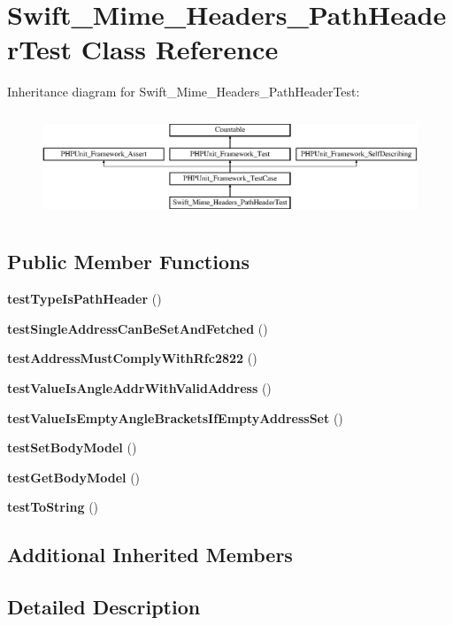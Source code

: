 \section{Swift\+\_\+\+Mime\+\_\+\+Headers\+\_\+\+Path\+Header\+Test Class Reference}
\label{class_swift___mime___headers___path_header_test}
Inheritance diagram for Swift\+\_\+\+Mime\+\_\+\+Headers\+\_\+\+Path\+Header\+Test\+:\begin{figure}[H]
\begin{center}
\leavevmode
\includegraphics[height=3.163842cm]{class_swift___mime___headers___path_header_test}
\end{center}
\end{figure}
\subsection*{Public Member Functions}
\begin{DoxyCompactItemize}
\item 
{\bf test\+Type\+Is\+Path\+Header} ()
\item 
{\bf test\+Single\+Address\+Can\+Be\+Set\+And\+Fetched} ()
\item 
{\bf test\+Address\+Must\+Comply\+With\+Rfc2822} ()
\item 
{\bf test\+Value\+Is\+Angle\+Addr\+With\+Valid\+Address} ()
\item 
{\bf test\+Value\+Is\+Empty\+Angle\+Brackets\+If\+Empty\+Address\+Set} ()
\item 
{\bf test\+Set\+Body\+Model} ()
\item 
{\bf test\+Get\+Body\+Model} ()
\item 
{\bf test\+To\+String} ()
\end{DoxyCompactItemize}
\subsection*{Additional Inherited Members}


\subsection{Detailed Description}


